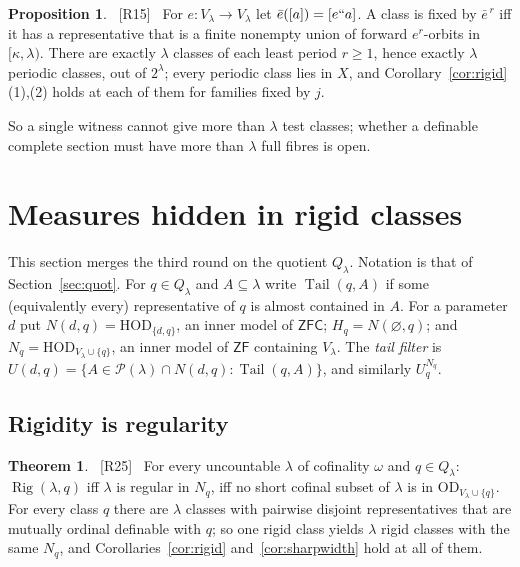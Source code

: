 \documentclass[11pt,letterpaper]{article}
\theoremstyle{definition}
\newtheorem{theorem}[definition]{Theorem}
\newtheorem{proposition}[definition]{Proposition}
\numberwithin{equation}{section}
\newcommand{\ZFC}{\mathsf{ZFC}}
\newcommand{\ZF}{\mathsf{ZF}}
\newcommand{\HOD}{\mathrm{HOD}}
\newcommand{\OD}{\mathrm{OD}}
\newcommand{\Pow}{\mathcal P}
\newcommand{\Rig}{\operatorname{Rig}}
\newcommand{\src}[1]{\unskip\ {\normalfont\small\sffamily\color{Olive}[#1]}\ }
\begin{document}
\begin{proposition}\label{prop:periodic}\src{R15}
For $e:V_\lambda\to V_\lambda$ let $\bar e([a])=[e``a]$. A class is fixed by $\bar e^{\,r}$ iff it has a representative that is a finite nonempty union of forward $e^r$-orbits in $[\kappa,\lambda)$. There are exactly $\lambda$ classes of each least period $r\ge1$, hence exactly $\lambda$ periodic classes, out of $2^\lambda$; every periodic class lies in $X$, and Corollary~\ref{cor:rigid}(1),(2) holds at each of them for families fixed by $j$.
\end{proposition}

So a single witness cannot give more than $\lambda$ test classes; whether a definable complete section must have more than $\lambda$ full fibres is open.

\section{Measures hidden in rigid classes}\label{sec:measures}

This section merges the third round on the quotient $Q_\lambda$. Notation is that of Section~\ref{sec:quot}. For $q\in Q_\lambda$ and $A\subseteq\lambda$ write $\operatorname{Tail}(q,A)$ if some (equivalently every) representative of $q$ is almost contained in $A$. For a parameter $d$ put $N(d,q)=\HOD_{\{d,q\}}$, an inner model of $\ZFC$; $H_q=N(\varnothing,q)$; and $N_q=\HOD_{V_\lambda\cup\{q\}}$, an inner model of $\ZF$ containing $V_\lambda$. The \emph{tail filter} is $U(d,q)=\{A\in\Pow(\lambda)\cap N(d,q):\operatorname{Tail}(q,A)\}$, and similarly $U_q^{N_q}$.

\subsection{Rigidity is regularity}

\begin{theorem}\label{thm:rigreg}\src{R25}
For every uncountable $\lambda$ of cofinality $\omega$ and $q\in Q_\lambda$: $\Rig(\lambda,q)$ iff $\lambda$ is regular in $N_q$, iff no short cofinal subset of $\lambda$ is in $\OD_{V_\lambda\cup\{q\}}$. For every class $q$ there are $\lambda$ classes with pairwise disjoint representatives that are mutually ordinal definable with $q$; so one rigid class yields $\lambda$ rigid classes with the same $N_q$, and Corollaries~\ref{cor:rigid} and~\ref{cor:sharpwidth} hold at all of them.
\end{theorem}
\end{document}
